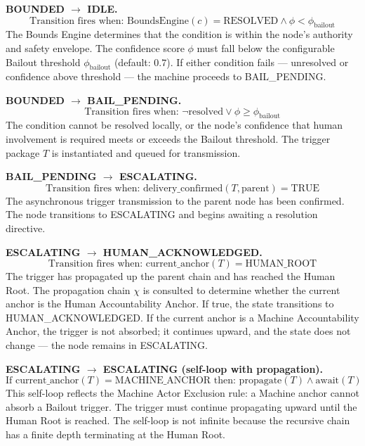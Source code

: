 \bigskip
\noindent\textbf{BOUNDED $\rightarrow$ IDLE.}
\begin{equation}
\text{Transition fires when: } \text{BoundsEngine}(c) = \text{RESOLVED} \land \phi < \phi_{\text{bailout}}
\end{equation}
The Bounds Engine determines that the condition is within the node's authority and safety envelope. The confidence score $\phi$ must fall below the configurable Bailout threshold $\phi_{\text{bailout}}$ (default: $0.7$). If either condition fails — unresolved or confidence above threshold — the machine proceeds to BAIL\_PENDING.

\bigskip
\noindent\textbf{BOUNDED $\rightarrow$ BAIL\_PENDING.}
\begin{equation}
\text{Transition fires when: } \neg \text{resolved} \lor \phi \geq \phi_{\text{bailout}}
\end{equation}
The condition cannot be resolved locally, or the node's confidence that human involvement is required meets or exceeds the Bailout threshold. The trigger package $T$ is instantiated and queued for transmission.

\bigskip
\noindent\textbf{BAIL\_PENDING $\rightarrow$ ESCALATING.}
\begin{equation}
\text{Transition fires when: } \text{delivery\_confirmed}(T, \text{parent}) = \text{TRUE}
\end{equation}
The asynchronous trigger transmission to the parent node has been confirmed. The node transitions to ESCALATING and begins awaiting a resolution directive.

\bigskip
\noindent\textbf{ESCALATING $\rightarrow$ HUMAN\_ACKNOWLEDGED.}
\begin{equation}
\text{Transition fires when: } \text{current\_anchor}(T) = \text{HUMAN\_ROOT}
\end{equation}
The trigger has propagated up the parent chain and has reached the Human Root. The propagation chain $\chi$ is consulted to determine whether the current anchor is the Human Accountability Anchor. If true, the state transitions to HUMAN\_ACKNOWLEDGED. If the current anchor is a Machine Accountability Anchor, the trigger is not absorbed; it continues upward, and the state does not change — the node remains in ESCALATING.

\bigskip
\noindent\textbf{ESCALATING $\rightarrow$ ESCALATING (self-loop with propagation).}
\begin{equation}
\text{If } \text{current\_anchor}(T) = \text{MACHINE\_ANCHOR} \text{ then: } \text{propagate}(T) \land \text{await}(T)
\end{equation}
This self-loop reflects the Machine Actor Exclusion rule: a Machine anchor cannot absorb a Bailout trigger. The trigger must continue propagating upward until the Human Root is reached. The self-loop is not infinite because the recursive chain has a finite depth terminating at the Human Root.

